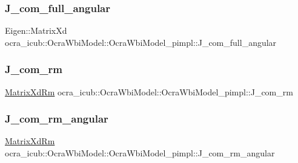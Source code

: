 \hypertarget{structOcraWbiModel_1_1OcraWbiModel__pimpl_ac064807ab1c8a89585cb7aa5f49d8744}{}\label{structOcraWbiModel_1_1OcraWbiModel__pimpl_ac064807ab1c8a89585cb7aa5f49d8744} 
\subsubsection{\texorpdfstring{J\+\_\+com\+\_\+full\+\_\+angular}{J\_com\_full\_angular}}
{\footnotesize\ttfamily Eigen\+::\+Matrix\+Xd ocra\+\_\+icub\+::\+Ocra\+Wbi\+Model\+::\+Ocra\+Wbi\+Model\+\_\+pimpl\+::\+J\+\_\+com\+\_\+full\+\_\+angular}

\hypertarget{structOcraWbiModel_1_1OcraWbiModel__pimpl_a58b26a33ee0449f71a3d338c23ea29d5}{}\label{structOcraWbiModel_1_1OcraWbiModel__pimpl_a58b26a33ee0449f71a3d338c23ea29d5} 
\subsubsection{\texorpdfstring{J\+\_\+com\+\_\+rm}{J\_com\_rm}}
{\footnotesize\ttfamily \hyperlink{namespaceocra__icub_aa5e36a19ed031c28ca83c207bd7dd83f}{Matrix\+Xd\+Rm} ocra\+\_\+icub\+::\+Ocra\+Wbi\+Model\+::\+Ocra\+Wbi\+Model\+\_\+pimpl\+::\+J\+\_\+com\+\_\+rm}

\hypertarget{structOcraWbiModel_1_1OcraWbiModel__pimpl_ad52987f0908ab1b44779e3d752a7b97b}{}\label{structOcraWbiModel_1_1OcraWbiModel__pimpl_ad52987f0908ab1b44779e3d752a7b97b} 
\subsubsection{\texorpdfstring{J\+\_\+com\+\_\+rm\+\_\+angular}{J\_com\_rm\_angular}}
{\footnotesize\ttfamily \hyperlink{namespaceocra__icub_aa5e36a19ed031c28ca83c207bd7dd83f}{Matrix\+Xd\+Rm} ocra\+\_\+icub\+::\+Ocra\+Wbi\+Model\+::\+Ocra\+Wbi\+Model\+\_\+pimpl\+::\+J\+\_\+com\+\_\+rm\+\_\+angular}


